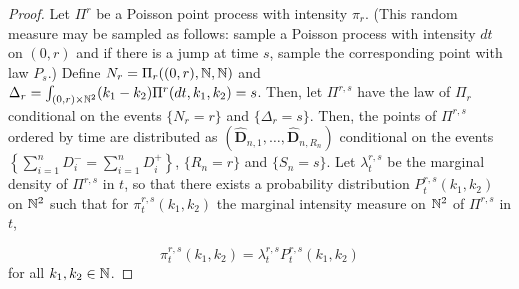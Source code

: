 \begin{proof}
Let ${\Pi}^r$ be a Poisson point process with intensity $\pi_r$. (This random measure may be sampled as follows: sample a Poisson process with intensity $dt$ on $(0,r)$ and if there is a jump at time $s$, sample the corresponding point with law $P_s$.)  Define $N_r= {\Pi}_r((0,r),{\mathbb N},{\mathbb N})$ and $\Delta_r=\int_{(0,r)\times {\mathbb N}^2}(k_1-k_2){\Pi}^r(dt,k_1,k_2)=s$. Then, let ${\Pi}^{r,s}$ have the law of ${\Pi}_r$ conditional on the events $\{N_r=r\}$ and $\{\Delta_r=s\}$. Then, the points of ${\Pi}^{r,s}$ ordered by time are distributed as $(\mathbf{\widehat{D}}_{n,1},\dots,\mathbf{\widehat{D}}_{n,R_n})$ conditional on the events $\left\{\sum_{i=1}^nD^-_i=\sum_{i=1}^nD^+_i\right\}$, $\{R_n=r\}$ and $\{S_n=s\}$. Let ${\lambda}^{r,s}_t$ be the marginal density of ${\Pi}^{r,s}$ in $t$, so that there exists a probability distribution ${P}^{r,s}_t(k_1,k_2)$ on ${\mathbb N}^2$ such that for ${\pi}^{r,s}_t(k_1,k_2)$ the marginal intensity measure on ${\mathbb N}^2$ of ${\Pi}^{r,s}$ in $t$, 

$${\pi}^{r,s}_t(k_1,k_2)={\lambda}^{r,s}_t{P}^{r,s}_t(k_1,k_2)$$
for all $k_1,k_2\in {\mathbb N}$.


\end{proof}
